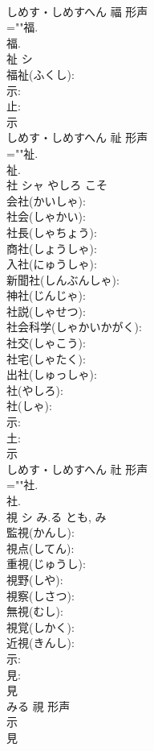 \documentclass[8pt]{extreport}
\begin{document}
\begin{CJK}{UTF8}{min}
\\	しめす・しめすへん	福	形声 
\\	=""福.
\\	福.
\\	祉	シ			
\\	福祉(ふくし): 
\\	示: 
\\	止: 
\\	示	
\\	しめす・しめすへん	祉	形声 
\\	=""祉.
\\	祉.
\\	社	シャ	やしろ	こそ	
\\	会社(かいしゃ): 
\\	社会(しゃかい): 
\\	社長(しゃちょう): 
\\	商社(しょうしゃ): 
\\	入社(にゅうしゃ): 
\\	新聞社(しんぶんしゃ): 
\\	神社(じんじゃ): 
\\	社説(しゃせつ): 
\\	社会科学(しゃかいかがく): 
\\	社交(しゃこう): 
\\	社宅(しゃたく): 
\\	出社(しゅっしゃ): 
\\	社(やしろ): 
\\	社(しゃ): 
\\	示: 
\\	土: 
\\	示	
\\	しめす・しめすへん	社	形声 
\\	=""社.
\\	社.
\\	視	シ	み.る	とも, み	
\\	監視(かんし): 
\\	視点(してん): 
\\	重視(じゅうし): 
\\	視野(しや): 
\\	視察(しさつ): 
\\	無視(むし): 
\\	視覚(しかく): 
\\	近視(きんし): 
\\	示: 
\\	見: 
\\	見	
\\	みる	視	形声 
\\	示 
\\	見 

\end{CJK}
\end{document}
